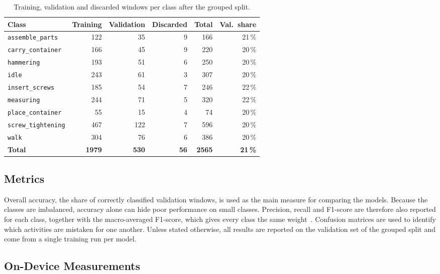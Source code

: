 \begin{table}[htbp]
\centering
\small
\renewcommand{\arraystretch}{1.15}
\begin{tabular}{|l|r|r|r|r|r|}
\hline
\textbf{Class} & \textbf{Training} & \textbf{Validation} & \textbf{Discarded} & \textbf{Total} & \textbf{Val.\ share} \\
\hline
\texttt{assemble\_parts}   & 122 &  35 & 9 & 166 & 21\,\% \\
\texttt{carry\_container}  & 166 &  45 & 9 & 220 & 20\,\% \\
\texttt{hammering}         & 193 &  51 & 6 & 250 & 20\,\% \\
\texttt{idle}              & 243 &  61 & 3 & 307 & 20\,\% \\
\texttt{insert\_screws}    & 185 &  54 & 7 & 246 & 22\,\% \\
\texttt{measuring}         & 244 &  71 & 5 & 320 & 22\,\% \\
\texttt{place\_container}  &  55 &  15 & 4 &  74 & 20\,\% \\
\texttt{screw\_tightening} & 467 & 122 & 7 & 596 & 20\,\% \\
\texttt{walk}              & 304 &  76 & 6 & 386 & 20\,\% \\
\hline
\textbf{Total} & \textbf{1979} & \textbf{530} & \textbf{56} & \textbf{2565} & \textbf{21\,\%} \\
\hline
\end{tabular}
\caption{Training, validation and discarded windows per class after the grouped
split.}
\label{tab:split}
\end{table}

\subsection{Metrics}
\label{sec:metrics}

Overall accuracy, the share of correctly classified validation windows, is used as
the main measure for comparing the models. Because the classes are imbalanced,
accuracy alone can hide poor performance on small classes. Precision, recall and
F1-score are therefore also reported for each class, together with the
macro-averaged F1-score, which gives every class the same
weight~\cite{bulling2014tutorial}. Confusion matrices are used to identify which activities are mistaken
for one another. Unless stated otherwise, all results are reported on the
validation set of the grouped split and come from a single training run per
model.

\subsection{On-Device Measurements}
\label{sec:device-measurements}

